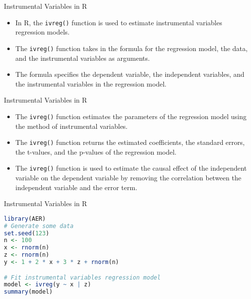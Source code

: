 \documentclass[serif, 9pt, aspectratio=32]{beamer}
\begin{document}
\begin{frame}{Instrumental Variables in R}
    \begin{itemize}
        \setlength{\itemsep}{2em}
        \item In R, the \texttt{ivreg()} function is used to estimate instrumental variables regression models.
        \item The \texttt{ivreg()} function takes in the formula for the regression model, the data, and the instrumental variables as arguments.
        \item The formula specifies the dependent variable, the independent variables, and the instrumental variables in the regression model.
    \end{itemize}
\end{frame}

\begin{frame}{Instrumental Variables in R}
    \begin{itemize}
        \setlength{\itemsep}{2em}
        \item The \texttt{ivreg()} function estimates the parameters of the regression model using the method of instrumental variables.
        \item The \texttt{ivreg()} function returns the estimated coefficients, the standard errors, the t-values, and the p-values of the regression model.
        \item The \texttt{ivreg()} function is used to estimate the causal effect of the independent variable on the dependent variable by removing the correlation between the independent variable and the error term.
    \end{itemize}
\end{frame}

\begin{frame}[fragile]{Instrumental Variables in R}
    \begin{lstlisting}[language=R]
library(AER)
# Generate some data 
set.seed(123)
n <- 100
x <- rnorm(n)
z <- rnorm(n)
y <- 1 + 2 * x + 3 * z + rnorm(n)

# Fit instrumental variables regression model
model <- ivreg(y ~ x | z)
summary(model)
    \end{lstlisting}
\end{frame}
\end{document}
